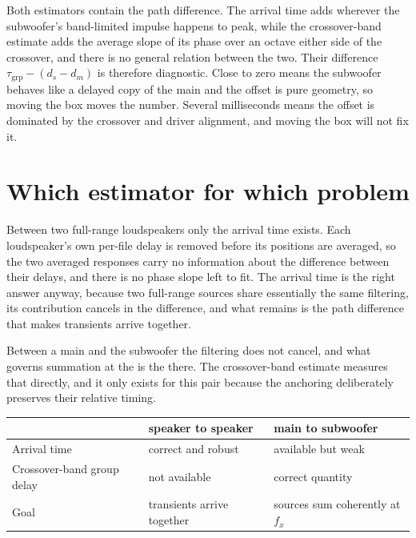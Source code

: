 Both estimators contain the path difference. The arrival time adds wherever the subwoofer's band-limited impulse happens to peak, while the crossover-band estimate adds the average slope of its phase over an octave either side of the crossover, and there is no general relation between the two. Their difference $\tau_{\mathrm{grp}} - (d_s - d_m)$ is therefore diagnostic. Close to zero means the subwoofer behaves like a delayed copy of the main and the offset is pure geometry, so moving the box moves the number. Several milliseconds means the offset is dominated by the crossover and driver alignment, and moving the box will not fix it.

\section{Which estimator for which problem}
Between two full-range loudspeakers only the arrival time exists. Each loudspeaker's own per-file delay is removed before its positions are averaged, so the two averaged responses carry no information about the difference between their delays, and there is no phase slope left to fit. The arrival time is the right answer anyway, because two full-range sources share essentially the same filtering, its contribution cancels in the difference, and what remains is the path difference that makes transients arrive together.

Between a main and the subwoofer the filtering does not cancel, and what governs summation at the  is the  there. The crossover-band estimate measures that directly, and it only exists for this pair because the anchoring deliberately preserves their relative timing.

\begin{center}
\begin{tabular}{lll}
\toprule
 & speaker to speaker & main to subwoofer \\
\midrule
Arrival time & correct and robust & available but weak \\
Crossover-band group delay & not available & correct quantity \\
Goal & transients arrive together & sources sum coherently at $f_x$ \\
\bottomrule
\end{tabular}
\end{center}

